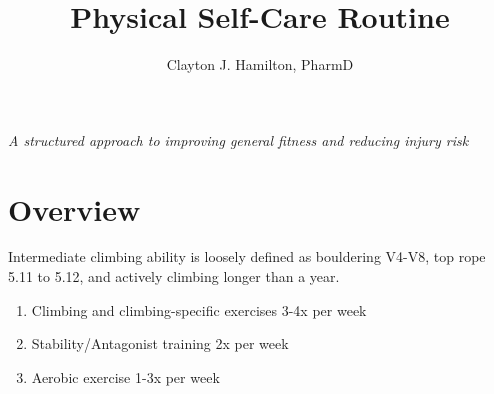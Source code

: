\documentclass[12pt, letterpaper]{article}
\title{Physical Self-Care Routine}
\author{Clayton J. Hamilton, PharmD}
\date{}
\begin{document}
\maketitle

\centerline{\textit{A structured approach to improving general fitness and reducing injury risk}}

\tableofcontents

\newpage %


\section{Overview}

Intermediate climbing ability is loosely defined as bouldering V4-V8, top rope 5.11 to 5.12, 
and actively climbing longer than a year.

\begin{enumerate}
      \item Climbing and climbing-specific exercises 3-4x per week
      \item Stability/Antagonist training 2x per week
      \item Aerobic exercise 1-3x per week
  \end{enumerate}
\end{document}
